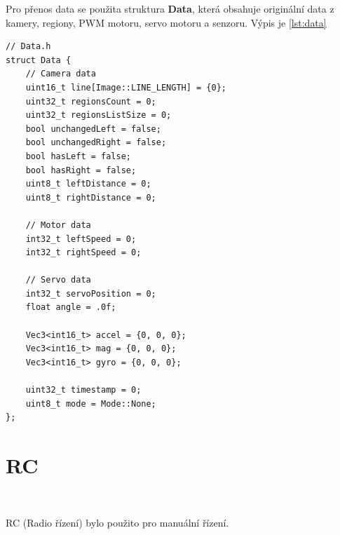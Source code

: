 Pro přenos data se použita struktura \textbf{Data}, která obsahuje originální data z kamery, regiony, PWM motoru, servo motoru a senzoru. Výpis je \ref{lst:data}
\begin{lstlisting}[caption=structura Data, label=lst:data]
// Data.h
struct Data {
    // Camera data
    uint16_t line[Image::LINE_LENGTH] = {0};
    uint32_t regionsCount = 0;
    uint32_t regionsListSize = 0;
    bool unchangedLeft = false;
    bool unchangedRight = false;
    bool hasLeft = false;
    bool hasRight = false;
    uint8_t leftDistance = 0;
    uint8_t rightDistance = 0;

    // Motor data
    int32_t leftSpeed = 0;
    int32_t rightSpeed = 0;

    // Servo data
    int32_t servoPosition = 0;
    float angle = .0f;

    Vec3<int16_t> accel = {0, 0, 0};
    Vec3<int16_t> mag = {0, 0, 0};
    Vec3<int16_t> gyro = {0, 0, 0};

    uint32_t timestamp = 0;
    uint8_t mode = Mode::None;
};
\end{lstlisting}


\section{RC}\

RC (Radio řízení) bylo použito pro manuální řízení.

\endinput
